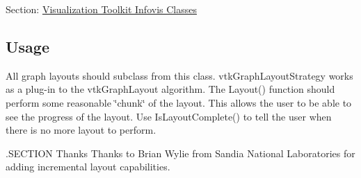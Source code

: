 Section\-: \hyperlink{sec_vtkinfovis}{Visualization Toolkit Infovis Classes} \hypertarget{vtkwidgets_vtkxyplotwidget_Usage}{}\subsection{Usage}\label{vtkwidgets_vtkxyplotwidget_Usage}
All graph layouts should subclass from this class. vtk\-Graph\-Layout\-Strategy works as a plug-\/in to the vtk\-Graph\-Layout algorithm. The Layout() function should perform some reasonable \char`\"{}chunk\char`\"{} of the layout. This allows the user to be able to see the progress of the layout. Use Is\-Layout\-Complete() to tell the user when there is no more layout to perform.

.S\-E\-C\-T\-I\-O\-N Thanks Thanks to Brian Wylie from Sandia National Laboratories for adding incremental layout capabilities.

